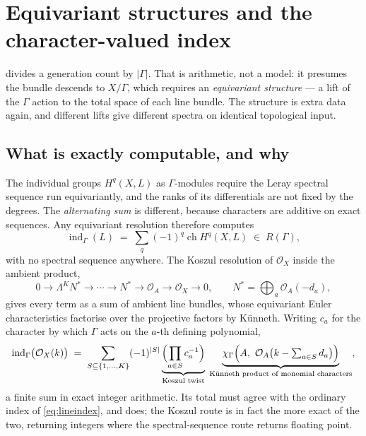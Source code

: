 \documentclass[11pt,a4paper]{article}
\newcommand{\cO}{\mathcal{O}}
\theoremstyle{definition}
\begin{document}
\section{Equivariant structures and the character-valued index}
\label{sec:equivariant}

 divides a generation count by $|\Gamma|$. That is arithmetic,
not a model: it presumes the bundle descends to $X/\Gamma$, which requires an
\emph{equivariant structure} --- a lift of the $\Gamma$ action to the total
space of each line bundle. The structure is extra data again, and different
lifts give different spectra on identical topological input.

\subsection{What is exactly computable, and why}

The individual groups $H^q(X, L)$ as $\Gamma$-modules require the Leray
spectral sequence run equivariantly, and the ranks of its differentials are
not fixed by the degrees. The \emph{alternating sum} is different, because
characters are additive on exact sequences. Any equivariant resolution
therefore computes
%
\begin{equation}
\operatorname{ind}_\Gamma(L)
\;=\; \sum_q (-1)^q \operatorname{ch} H^q(X, L) \;\in\; R(\Gamma) ,
\end{equation}
%
with no spectral sequence anywhere. The Koszul resolution of $\cO_X$ inside
the ambient product,
%
\begin{equation}
0 \to \Lambda^K N^* \to \cdots \to N^* \to \cO_A \to \cO_X \to 0,
\qquad N^* = \bigoplus_a \cO_A(-d_a),
\end{equation}
%
gives every term as a sum of ambient line bundles, whose equivariant Euler
characteristics factorise over the projective factors by K\"unneth. Writing
$c_a$ for the character by which $\Gamma$ acts on the $a$-th defining
polynomial,
%
\begin{equation}
\operatorname{ind}_\Gamma\bigl(\cO_X(k)\bigr)
\;=\;
\sum_{S \subseteq \{1,\dots,K\}} (-1)^{|S|}
\underbrace{\Bigl(\prod_{a \in S} c_a^{-1}\Bigr)}_{\text{Koszul twist}}
\;
\underbrace{\chi_\Gamma\Bigl(A,\ \cO_A\bigl(k - \textstyle\sum_{a\in S} d_a\bigr)\Bigr)}_{\text{K\"unneth product of monomial characters}} ,
\label{eq:koszulindex}
\end{equation}
%
a finite sum in exact integer arithmetic. Its total must agree with the
ordinary index of \cref{eq:lineindex}, and does; the Koszul route is in fact
the more exact of the two, returning integers where the spectral-sequence
route returns floating point.
\end{document}

